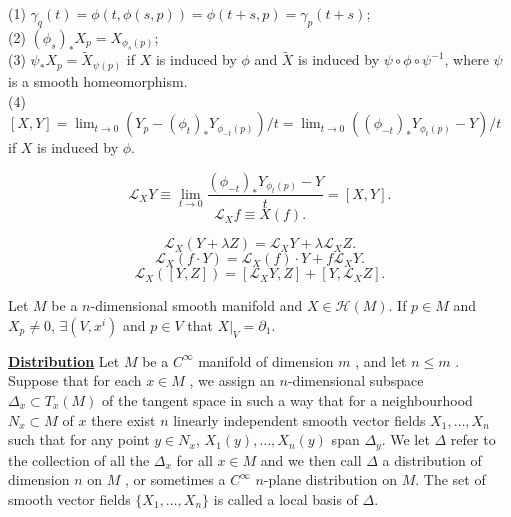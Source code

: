 \begin{newprop}
(1) $\gamma_q(t) = \phi(t,\phi(s,p)) = \phi(t+s,p) = \gamma_p(t+s)$;\\
(2) $(\phi_s)_{*}X_p = X_{\phi_s(p)}$;\\
(3) $\psi_{*} X_p = \tilde{X}_{\psi(p)}$ if $X$ is induced by $\phi$ and $\tilde{X}$ is induced by $\psi \circ \phi \circ \psi^{-1} $, where $\psi$ is a smooth  homeomorphism.\\
(4) $[X,Y] = \lim_{t \to 0} ({Y_p-(\phi_t)_* Y_{\phi_{-t}(p)}})/{t} = \lim_{t \to 0} ({(\phi_{-t})_*Y_{\phi_t(p)}- Y})/{t}$ if $X$ is induced by $\phi$.
\end{newprop}

\begin{newdef}
\[\mathcal{L}_{X}Y \equiv \lim_{t \to 0} \frac{(\phi_{-t})_*Y_{\phi_t(p)}- Y}{t} =[X,Y].\]
\[\mathcal{L}_{X}f \equiv X(f).\]
\end{newdef}

\begin{newprop}
\[\mathcal{L}_{X}(Y + \lambda Z) = \mathcal{L}_{X}Y + \lambda\mathcal{L}_{X}Z.\]
\[\mathcal{L}_{X}(f \cdot Y) = \mathcal{L}_{X}(f) \cdot Y + f\mathcal{L}_{X}Y.\]
\[\mathcal{L}_{X}([Y,Z]) = [\mathcal{L}_{X}Y,Z]+ [Y,\mathcal{L}_{X}Z].\]
\end{newprop}

\begin{newthem}
Let $M$ be a $n$-dimensional smooth manifold and $X \in \mathcal{H}(M)$. If $p \in M$ and $X_p \neq 0$, $\exists (V,x^i)$ and $p \in V$ that $X|_V = \partial_{1}$.
\end{newthem}

\begin{newdef}[Distribution]
\href{https://en.wikipedia.org/wiki/Distribution_(differential_geometry)}{\textbf{Distribution}} Let $M$ be a $C^{\infty }$  manifold of dimension $m$ , and let $n \leq m$ . Suppose that for each $x\in M$ , we assign an $n$-dimensional subspace $\Delta _{x}\subset T_{x}(M)$ of the tangent space in such a way that for a neighbourhood $N_{x}\subset M$ of $x$ there exist $n$ linearly independent smooth vector fields $X_{1},\ldots ,X_{n}$ such that for any point $y\in N_{x}$, $X_{1}(y),\ldots ,X_{n}(y)$ span $\Delta _{y}$. We let $\Delta$  refer to the collection of all the $\Delta_{x}$ for all $ x\in M$ and we then call $\Delta$ a distribution of dimension $n$ on $M$ , or sometimes a $C^{\infty }$ $n$-plane distribution on $M$. The set of smooth vector fields $\{X_{1},\ldots ,X_{n}\}$ is called a local basis of $\Delta$.
\end{newdef}

